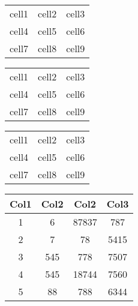 \documentclass{article}
\begin{document}
	\begin{center}
		\begin{tabular}{c c c}
			cell1 & cell2 & cell3 \\ 
			cell4 & cell5 & cell6 \\  
			cell7 & cell8 & cell9
		\end{tabular}
	\end{center}
	\begin{center}
		\begin{tabular}{| c | c | c |}
			cell1 & cell2 & cell3 \\ 
			cell4 & cell5 & cell6 \\  
			cell7 & cell8 & cell9
		\end{tabular}
	\end{center}
		\begin{center}
		\begin{tabular}{| c | c | c |}
			\hline
			cell1 & cell2 & cell3 \\ 
			cell4 & cell5 & cell6 \\  
			cell7 & cell8 & cell9 \\
			\hline
		\end{tabular}
	\end{center}
	\begin{center}
		\begin{tabular}{||c c c c||} 
			\hline
			Col1 & Col2 & Col2 & Col3 \\ [0.5ex] 
			\hline\hline
			1 & 6 & 87837 & 787 \\ 
			\hline
			2 & 7 & 78 & 5415 \\
			\hline
			3 & 545 & 778 & 7507 \\
			\hline
			4 & 545 & 18744 & 7560 \\
			\hline
			5 & 88 & 788 & 6344 \\ [1ex] 
			\hline
		\end{tabular}
	\end{center}
\end{document}
